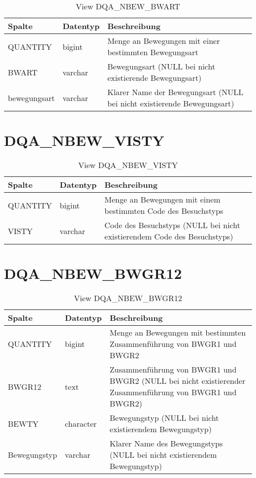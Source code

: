   \begin{table}[ht]
    \centering
    \caption{View DQA\_NBEW\_BWART}
    \label{tab:dqanbewbwart}
    \begin{tabular}{||l|l|p{10cm}||}
      \hline
      Spalte & Datentyp & Beschreibung \\ [0.5ex] \hline \hline
QUANTITY & bigint & Menge an Bewegungen mit einer bestimmten Bewegungsart \\ \hline
BWART & varchar & Bewegungsart (NULL bei nicht existierende Bewegungsart)\\ \hline
bewegungsart & varchar & Klarer Name der Bewegungsart (NULL bei nicht existierende Bewegungsart)\\ \hline
    \end{tabular}
  \end{table}

\section{DQA\_NBEW\_VISTY}

\begin{table}[ht]
	\centering
	\caption{View DQA\_NBEW\_VISTY}
	\label{tab:dqanbewvisty}
	\begin{tabular}{||l|l|p{10cm}||}
		\hline
		Spalte & Datentyp & Beschreibung \\ [0.5ex] \hline \hline
		QUANTITY & bigint & Menge an Bewegungen mit einem bestimmten Code des Besuchstyps \\ \hline
		VISTY & varchar & Code des Besuchstyps (NULL bei nicht existierendem Code des Besuchstyps)\\ \hline
	\end{tabular}
\end{table}

 \clearpage
  \section{DQA\_NBEW\_BWGR12}

  \begin{table}[ht]
    \centering
    \caption{View DQA\_NBEW\_BWGR12}
    \label{tab:dqanbewbwgr12}
    \begin{tabular}{||l|l|p{10cm}||}
      \hline
      Spalte & Datentyp & Beschreibung \\ [0.5ex] \hline \hline
QUANTITY & bigint & Menge an Bewegungen mit bestimmten Zusammenführung von BWGR1 und BWGR2 \\ \hline
BWGR12 & text & Zusammenführung von BWGR1 und BWGR2 (NULL bei nicht existierender Zusammenführung von BWGR1 und BWGR2)\\ \hline
BEWTY & character & Bewegungstyp (NULL bei nicht existierendem Bewegungstyp)\\ \hline
Bewegungstyp & varchar & Klarer Name des Bewegungstyps (NULL bei nicht existierendem Bewegungstyp)\\ \hline
    \end{tabular}
  \end{table}

